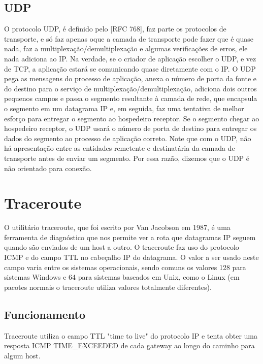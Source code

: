 \documentclass[
	article,			%
	11pt,				%
	oneside,			%
	a4paper,			%
	english,			%
	brazil,				%
	sumario=tradicional
	]{abntex2}
\begin{document}
\subsection{UDP}
 O protocolo UDP, é definido pelo [RFC 768], faz parte os protocolos de transporte, e só faz apenas oque a camada de transporte pode fazer que é quase nada, faz a multiplexação/demultiplexação e algumas verificações de erros, ele nada adiciona ao IP. Na verdade, se o criador de aplicação escolher o UDP, e vez de TCP, a aplicação estará se comunicando quase diretamente com o IP. O UDP pega as mensagens do processo de aplicação, anexa o número de porta da fonte e do destino para o serviço de multiplexação/demultiplexação, adiciona dois outros pequenos campos e passa o segmento resultante à camada de rede, que encapsula o segmento em um datagrama IP e, em seguida, faz uma tentativa de melhor esforço para entregar o segmento ao hospedeiro receptor. Se o segmento chegar ao hospedeiro receptor, o UDP usará o número de porta de destino para entregar os dados do segmento ao processo de aplicação correto. Note que com o UDP, não há apresentação entre as entidades remetente e destinatária da camada de transporte antes de enviar um segmento. Por essa razão, dizemos que o UDP é não orientado para conexão.\cite{Kurose}

\section{Traceroute}
O utilitário traceroute, que foi escrito por Van Jacobson em 1987, é uma ferramenta de diagnóstico que nos permite ver a rota que datagramas IP seguem quando são enviados de um host a outro. O traceroute faz uso do protocolo ICMP e do campo TTL no cabeçalho IP do datagrama. O valor a ser usado neste campo varia entre os sistemas operacionais, sendo comuns os valores 128 para sistemas Windows e 64 para sistemas baseados em Unix, como o Linux (em pacotes normais o traceroute utiliza valores totalmente diferentes).

\subsection{Funcionamento} \label{sec:funcioanemnto}
Traceroute utiliza o campo TTL "time to live" do protocolo IP e tenta obter uma resposta ICMP TIME\_EXCEEDED de cada gateway ao longo do caminho para algum host.
\end{document}
